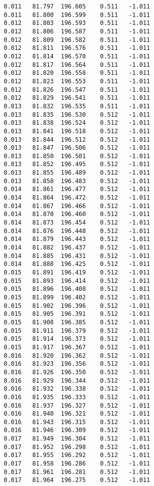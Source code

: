 \begin{verbatim}
   0.011   81.797  196.605    0.511   -1.011
   0.011   81.800  196.599    0.511   -1.011
   0.012   81.803  196.593    0.511   -1.011
   0.012   81.806  196.587    0.511   -1.011
   0.012   81.809  196.582    0.511   -1.011
   0.012   81.811  196.576    0.511   -1.011
   0.012   81.814  196.570    0.511   -1.011
   0.012   81.817  196.564    0.511   -1.011
   0.012   81.820  196.558    0.511   -1.011
   0.012   81.823  196.553    0.511   -1.011
   0.012   81.826  196.547    0.511   -1.011
   0.012   81.829  196.541    0.511   -1.011
   0.013   81.832  196.535    0.511   -1.011
   0.013   81.835  196.530    0.512   -1.011
   0.013   81.838  196.524    0.512   -1.011
   0.013   81.841  196.518    0.512   -1.011
   0.013   81.844  196.512    0.512   -1.011
   0.013   81.847  196.506    0.512   -1.011
   0.013   81.850  196.501    0.512   -1.011
   0.013   81.852  196.495    0.512   -1.011
   0.013   81.855  196.489    0.512   -1.011
   0.013   81.858  196.483    0.512   -1.011
   0.014   81.861  196.477    0.512   -1.011
   0.014   81.864  196.472    0.512   -1.011
   0.014   81.867  196.466    0.512   -1.011
   0.014   81.870  196.460    0.512   -1.011
   0.014   81.873  196.454    0.512   -1.011
   0.014   81.876  196.448    0.512   -1.011
   0.014   81.879  196.443    0.512   -1.011
   0.014   81.882  196.437    0.512   -1.011
   0.014   81.885  196.431    0.512   -1.011
   0.014   81.888  196.425    0.512   -1.011
   0.015   81.891  196.419    0.512   -1.011
   0.015   81.893  196.414    0.512   -1.011
   0.015   81.896  196.408    0.512   -1.011
   0.015   81.899  196.402    0.512   -1.011
   0.015   81.902  196.396    0.512   -1.011
   0.015   81.905  196.391    0.512   -1.011
   0.015   81.908  196.385    0.512   -1.011
   0.015   81.911  196.379    0.512   -1.011
   0.015   81.914  196.373    0.512   -1.011
   0.015   81.917  196.367    0.512   -1.011
   0.016   81.920  196.362    0.512   -1.011
   0.016   81.923  196.356    0.512   -1.011
   0.016   81.926  196.350    0.512   -1.011
   0.016   81.929  196.344    0.512   -1.011
   0.016   81.932  196.338    0.512   -1.011
   0.016   81.935  196.333    0.512   -1.011
   0.016   81.937  196.327    0.512   -1.011
   0.016   81.940  196.321    0.512   -1.011
   0.016   81.943  196.315    0.512   -1.011
   0.016   81.946  196.309    0.512   -1.011
   0.017   81.949  196.304    0.512   -1.011
   0.017   81.952  196.298    0.512   -1.011
   0.017   81.955  196.292    0.512   -1.011
   0.017   81.958  196.286    0.512   -1.011
   0.017   81.961  196.281    0.512   -1.011
   0.017   81.964  196.275    0.512   -1.011

\end{verbatim}
